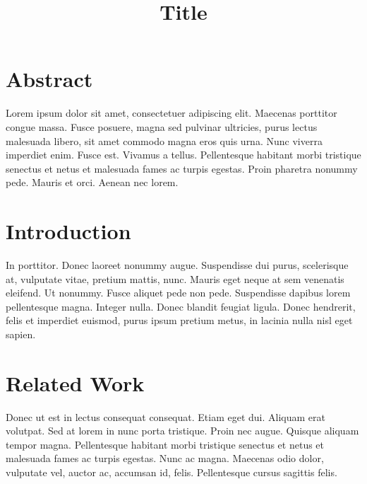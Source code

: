 



\title{Title}
\date{}

 

\maketitle


\section*{Abstract} %
\label{abstract}

Lorem ipsum dolor sit amet, consectetuer adipiscing elit. Maecenas porttitor
congue massa. Fusce posuere, magna sed pulvinar ultricies, purus lectus
malesuada libero, sit amet commodo magna eros quis urna. Nunc viverra
imperdiet enim. Fusce est. Vivamus a tellus. Pellentesque habitant morbi
tristique senectus et netus et malesuada fames ac turpis egestas. Proin
pharetra nonummy pede. Mauris et orci. Aenean nec lorem.


\section{Introduction} %
\label{sec:introduction}

In porttitor. Donec laoreet nonummy augue. Suspendisse dui purus, scelerisque
at, vulputate vitae, pretium mattis, nunc. Mauris eget neque at sem venenatis
eleifend. Ut nonummy. Fusce aliquet pede non pede. Suspendisse dapibus lorem
pellentesque magna. Integer nulla. Donec blandit feugiat ligula. Donec
hendrerit, felis et imperdiet euismod, purus ipsum pretium metus, in lacinia
nulla nisl eget sapien.



\section{Related Work} %
\label{sec:related_work}

Donec ut est in lectus consequat consequat. Etiam eget dui. Aliquam erat
volutpat. Sed at lorem in nunc porta tristique. Proin nec augue. Quisque
aliquam tempor magna. Pellentesque habitant morbi tristique senectus et netus
et malesuada fames ac turpis egestas. Nunc ac magna. Maecenas odio dolor,
vulputate vel, auctor ac, accumsan id, felis. Pellentesque cursus sagittis
felis.

